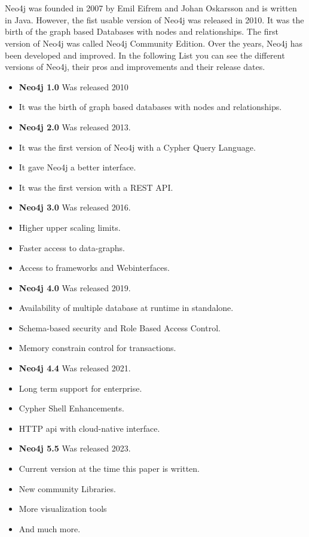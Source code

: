 
\section{} \label{sec:history}
Neo4j was founded in 2007 by Emil Eifrem and Johan Oskarsson and is written in Java.
However, the fist usable version of Neo4j was released in 2010.
It was the birth of the graph based Databases with nodes and relationships.
The first version of Neo4j was called Neo4j Community Edition.
Over the years, Neo4j has been developed and improved.
In the following List you can see the different versions of Neo4j, their pros and improvements and their release dates.
\begin{itemize}
    \item \textbf{Neo4j 1.0} Was released 2010
    \item It was the birth of graph based databases with nodes and relationships.
\end{itemize}
\begin{itemize}
    \item \textbf{Neo4j 2.0} Was released 2013.
    \item It was the first version of Neo4j with a Cypher Query Language.
    \item It gave Neo4j a better interface.
    \item It was the first version with a REST API.
\end{itemize}
\begin{itemize}
    \item \textbf{Neo4j 3.0} Was released 2016.
    \item Higher upper scaling limits.
    \item Faster access to data-graphs.
    \item Access to frameworks and Webinterfaces.
\end{itemize}
\begin{itemize}
    \item \textbf{Neo4j 4.0} Was released 2019.
    \item Availability of multiple database at runtime in standalone.
    \item Schema-based security and Role Based Access Control.
    \item Memory constrain control for transactions.
\end{itemize}
\begin{itemize}
    \item \textbf{Neo4j 4.4} Was released 2021.
    \item Long term support for enterprise.
    \item Cypher Shell Enhancements.
    \item HTTP api with cloud-native interface.
\end{itemize}
\begin{itemize}
    \item \textbf{Neo4j 5.5} Was released 2023.
    \item Current version at the time this paper is written.
    \item New community Libraries.
    \item More visualization tools
    \item And much more.
\end{itemize}
